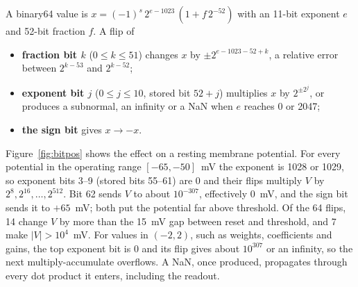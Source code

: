 \documentclass[11pt,a4paper]{article}
\begin{document}
A binary64 value is $x = (-1)^{s}\, 2^{e-1023}\,(1 + f\,2^{-52})$ with an 11-bit exponent $e$ and 52-bit fraction $f$. A flip of
\begin{itemize}
  \item \textbf{fraction bit $k$} ($0 \le k \le 51$) changes $x$ by $\pm 2^{e-1023-52+k}$, a relative error between $2^{k-53}$ and $2^{k-52}$;
  \item \textbf{exponent bit $j$} ($0 \le j \le 10$, stored bit $52+j$) multiplies $x$ by $2^{\pm 2^{j}}$, or produces a subnormal, an infinity or a NaN when $e$ reaches 0 or 2047;
  \item \textbf{the sign bit} gives $x \to -x$.
\end{itemize}
Figure~\ref{fig:bitpos} shows the effect on a resting membrane potential. For every potential in the operating range $[-65,-50]$~mV the exponent is 1028 or 1029, so exponent bits 3--9 (stored bits 55--61) are 0 and their flips multiply $V$ by $2^{8}, 2^{16}, \dots, 2^{512}$. Bit 62 sends $V$ to about $10^{-307}$, effectively 0~mV, and the sign bit sends it to $+65$~mV; both put the potential far above threshold. Of the 64 flips, 14 change $V$ by more than the 15~mV gap between reset and threshold, and 7 make $|V| > 10^{4}$~mV. For values in $(-2,2)$, such as weights, coefficients and gains, the top exponent bit is 0 and its flip gives about $10^{307}$ or an infinity, so the next multiply-accumulate overflows. A NaN, once produced, propagates through every dot product it enters, including the readout.
\end{document}
